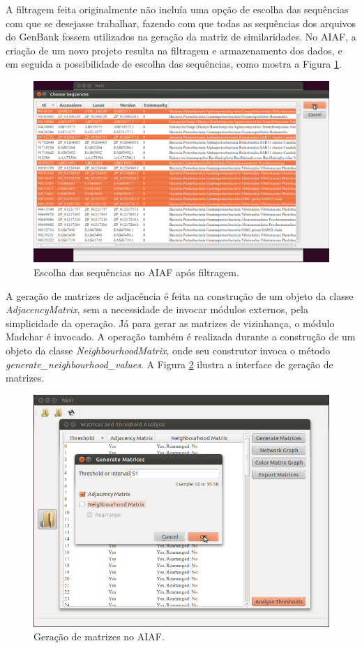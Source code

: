 A filtragem feita originalmente não incluía uma opção de escolha das sequências com que se desejasse trabalhar, fazendo com que todas as sequências dos
arquivos do GenBank fossem utilizados na geração da matriz de similaridades. No AIAF, a criação de um novo projeto resulta
na filtragem e armazenamento dos dados, e em seguida a possibilidade de escolha das sequências, como mostra a Figura \ref{fig:choose-sequences}.

\begin{figure}
\centering
\includegraphics[scale=0.38]{choose-sequences}
\caption{Escolha das sequências no AIAF após filtragem.}
\label{fig:choose-sequences}
\end{figure}

A geração de matrizes de adjacência é feita na construção de um objeto da classe \textit{AdjacencyMatrix}, sem a
necessidade de invocar módulos externos, pela simplicidade da operação. Já para gerar as matrizes de vizinhança, o módulo Madchar é invocado. A operação
também é realizada durante a construção de um objeto da classe \textit{NeighbourhoodMatrix}, onde seu construtor invoca o método
\textit{generate\_neighbourhood\_values}. A Figura \ref{fig:generate-matrices} ilustra a interface de geração de matrizes.

\begin{figure}
\centering
\includegraphics[scale=0.38]{generate-matrices}
\caption{Geração de matrizes no AIAF.}
\label{fig:generate-matrices}
\end{figure}

